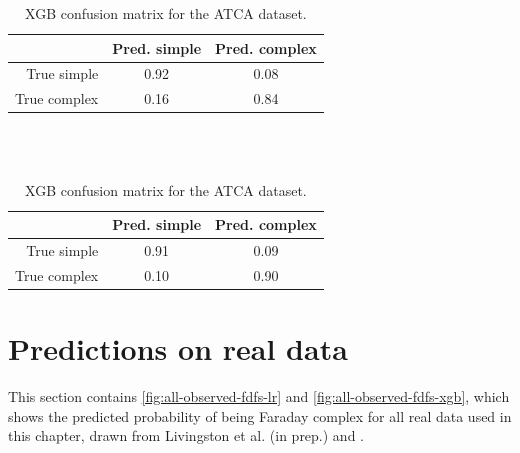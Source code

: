     \begin{table}
      \caption{\label{tab:cm-lr} Logistic regression confusion matrix for the ATCA dataset.}
      \begin{tabular}{r|cc}
        \hline\hline
        & Pred. simple & Pred. complex \\\hline
        True simple & 0.92 & 0.08 \\
        True complex & 0.16 & 0.84 \\
        \hline\hline
      \end{tabular}\\
      \\
      \caption{\label{tab:cm-xgb} XGB confusion matrix for the ATCA dataset.}
      \begin{tabular}{r|cc}
        \hline\hline
        & Pred. simple & Pred. complex \\\hline
        True simple & 0.91 & 0.09 \\
        True complex & 0.10 & 0.90 \\
        \hline\hline
      \end{tabular}
    \end{table}

\section{Predictions on real data}
\label{sec:faraday-real-data-fig}

  This section contains \autoref{fig:all-observed-fdfs-lr} and \autoref{fig:all-observed-fdfs-xgb}, which shows the predicted probability of being Faraday complex for all real data used in this chapter, drawn from Livingston et al. (in prep.) and \citet{osullivan_broad-band_2017}.

